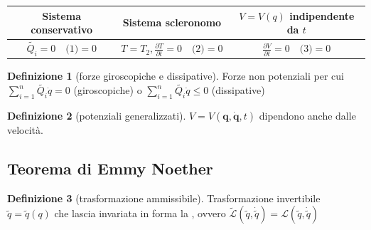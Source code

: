 \documentclass[a4paper,10pt]{article}
\theoremstyle{definition}
\providecommand{\tabularnewline}{\\}
\newcommand{\bv}{\boldsymbol} %
\theoremstyle{indentdefinition}
\newtheorem{defn}{Definizione}[section]
\theoremstyle{indenttheorem}
\theoremstyle{myremark}
\theoremstyle{indentgeneral}
\begin{document}
\begin{center}
\begin{tabular}{ccc}
\toprule 
Sistema conservativo & Sistema scleronomo & $V=V\left(q\right)$ indipendente da $t$\tabularnewline
\midrule 
$\widetilde{Q_{i}}=0\quad\text{(1)}=0$ & $T=T_{2},\frac{\partial T}{\partial t}=0\quad\text{(2)}=0$ & $\frac{\partial V}{\partial t}=0\quad\text{(3)}=0$\tabularnewline
\bottomrule
\end{tabular}
\par\end{center}
\begin{defn}[forze giroscopiche e dissipative]
Forze non potenziali per cui $\sum_{i=1}^{n}\widetilde{Q_{i}}\dot{q}=0$
(giroscopiche) o $\sum_{i=1}^{n}\widetilde{Q_{i}}\dot{q}\leq0$ (dissipative)
\end{defn}

\begin{defn}[potenziali generalizzati]
$V=V\left(\bv{q},\dot{\bv{q}},t\right)$ dipendono anche dalle velocità.
\end{defn}


\subsection{Teorema di Emmy Noether}
\begin{defn}[trasformazione ammissibile]
\label{def:trasformazione-ammissibile}Trasformazione invertibile $\widetilde{q}=\widetilde{q}\left(q\right)$
che lascia invariata in forma la , ovvero
$\widetilde{\mathcal{L}}(\widetilde{q},\dot{\widetilde{q}})=\mathcal{L}(\widetilde{q},\dot{\widetilde{q}})$
\end{defn}
\end{document}
